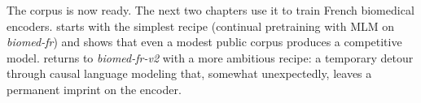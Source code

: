\vspace{2em}

\begin{reviewread}
The corpus is now ready. The next two chapters use it to train French biomedical encoders.  starts with the simplest recipe (continual pretraining with MLM on \textit{biomed-fr}) and shows that even a modest public corpus produces a competitive model.  returns to \textit{biomed-fr-v2} with a more ambitious recipe: a temporary detour through causal language modeling that, somewhat unexpectedly, leaves a permanent imprint on the encoder.
\end{reviewread}
